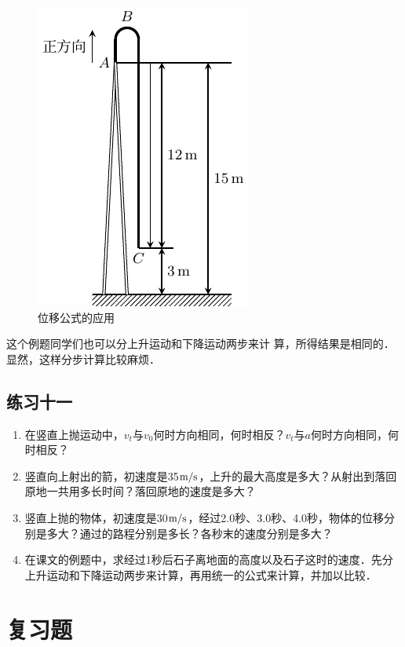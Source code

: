 \begin{figure}[htp]
    \centering
    \includegraphics{fig/A/2-22.pdf}
    \caption{位移公式的应用}\label{fig_A_2-22}
\end{figure}


这个例题同学们也可以分上升运动和下降运动两步来计
算，所得结果是相同的．显然，这样分步计算比较麻烦．


\subsection*{练习十一}

\begin{enumerate}
	\item 在竖直上抛运动中，$v_t$与$v_0$何时方向相同，何时相反？$v_t$与$a$何时方向相同，何时相反？
\item 竖直向上射出的箭，初速度是35$\text{m}/\text{s}$，上升的最大高度是多大？从射出到落回原地一共用多长时间？落回原地的速度是多大？
\item 竖直上抛的物体，初速度是30$\text{m}/\text{s}$，经过2.0秒、3.0秒、4.0秒，物体的位移分别是多大？通过的路程分别是多长？各秒末的速度分别是多大？
\item 在课文的例题中，求经过1秒后石子离地面的高度以及石子这时的速度．先分上升运动和下降运动两步来计算，再用统一的公式来计算，并加以比较．
\end{enumerate}

\section*{复习题}

